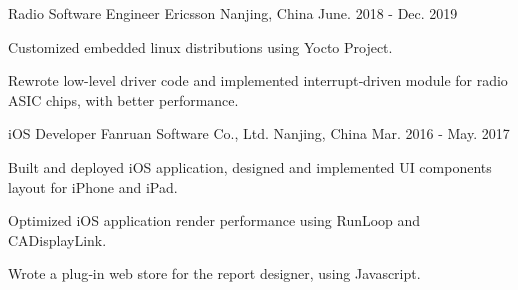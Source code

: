 \begin{cventries}
 \cventry
    {Radio Software Engineer} %
    {Ericsson} %
    {Nanjing, China} %
    {June. 2018 - Dec. 2019} %
    {
      \begin{cvitems} %
        \item {Customized embedded linux distributions using Yocto Project.}
        \item {Rewrote low-level driver code and implemented interrupt‐driven module for radio ASIC chips, with better performance.}
      \end{cvitems}
    }

 \cventry
    {iOS Developer} %
    {Fanruan Software Co., Ltd.} %
    {Nanjing, China} %
    {Mar. 2016 - May. 2017} %
    {
      \begin{cvitems} %
        \item {Built and deployed iOS application, designed and implemented UI components layout for iPhone and iPad.}
        \item {Optimized iOS application render performance using RunLoop and CADisplayLink.}
        \item {Wrote a plug‐in web store for the report designer, using Javascript.}
      \end{cvitems}
    }

\end{cventries}

